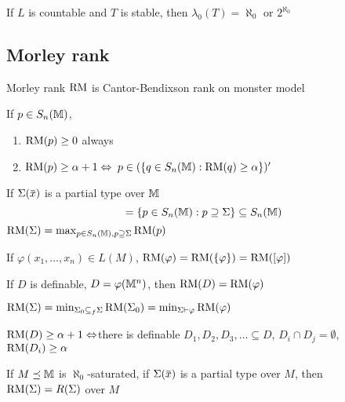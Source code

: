 \documentclass[11pt]{article}
\begin{document}
\begin{theorem}[]
If \(L\) is countable and \(T\) is stable, then \(\lambda_0(T)=\aleph_0\) or \(2^{\aleph_0}\)
\end{theorem}

\subsection{Morley rank}
\label{sec:orge8972cc}

\begin{definition}[]
Morley rank \(\operatorname{RM}\) is Cantor-Bendixson rank on monster model
\end{definition}

If \(p\in S_n(\mathbb{M})\),
\begin{enumerate}
\item \(\operatorname{RM}(p)\ge 0\) always
\item \(\operatorname{RM}(p)\ge\alpha+1 \Leftrightarrow\) \(p\in(\{q\in S_n(\mathbb{M}):\operatorname{RM}(q)\ge\alpha\})'\)
\end{enumerate}
If \(\Sigma(\barx)\) is a partial type over \(\mathbb{M}\)
\begin{equation*}
[\Sigma]=\{p\in S_n(\M):p\supseteq\Sigma\}\subseteq S_n(\M)
\end{equation*}
\(\operatorname{RM}(\Sigma)=\max_{p\in S_n(\mathbb{M}),p\supseteq\Sigma}\operatorname{RM}(p)\)

If \(\varphi(x_1,\dots,x_n)\in L(M)\), \(\operatorname{RM}(\varphi)=\operatorname{RM}(\{\varphi\})=\operatorname{RM}([\varphi])\)

If \(D\) is definable, \(D=\varphi(\mathbb{M}^n)\), then \(\operatorname{RM}(D)=\operatorname{RM}(\varphi)\)


\(\operatorname{RM}(\Sigma)=\min_{\Sigma_0\subseteq_f\Sigma}\operatorname{RM}(\Sigma_0)=\min_{\Sigma\vdash\varphi}\operatorname{RM}(\varphi)\)

\(\operatorname{RM}(D)\ge\alpha+1 \Leftrightarrow\)there is definable \(D_1,D_2,D_3,\dots\subseteq D\), \(D_i\cap D_j=\emptyset\), \(\operatorname{RM}(D_i)\ge\alpha\)

\begin{lemma}[]
If \(M\preceq\mathbb{M}\) is \(\aleph_0\)-saturated, if \(\Sigma(\barx)\) is a partial type over \(M\),
then \(\operatorname{RM}(\Sigma)=R(\Sigma)\) over \(M\)
\end{lemma}
\end{document}
